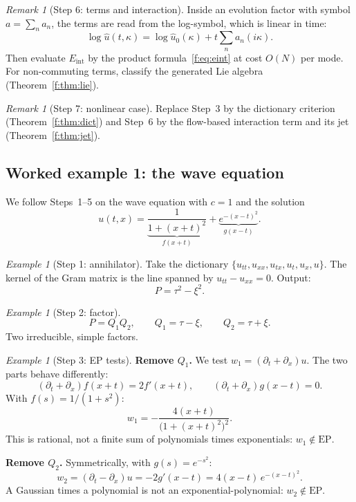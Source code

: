 \documentclass[11pt]{article}
\theoremstyle{plain}
\theoremstyle{definition}
\theoremstyle{remark}
\newtheorem{remark}[theorem]{Remark}
\newtheorem{example}[theorem]{Example}
\newcommand{\EP}{\mathrm{EP}}               %
\newcommand{\Eint}{E_{\mathrm{int}}}        %
\newenvironment{aside}[1]{\begin{remark}[#1]}{\end{remark}}
\begin{document}
\begin{aside}{Step 6: terms and interaction}
Inside an evolution factor with symbol $a=\sum_na_n$, the terms are read from the log-symbol, which is linear in time:
\[
\log\hat u(t,\kappa)=\log\hat u_0(\kappa)+t\sum_na_n(i\kappa).
\]
Then evaluate $\Eint$ by the product formula~\eqref{f:eq:eint} at cost $O(N)$ per mode. For non-commuting terms, classify the generated Lie algebra (Theorem~\ref{f:thm:lie}).
\end{aside}

\begin{aside}{Step 7: nonlinear case}
Replace Step~3 by the dictionary criterion (Theorem~\ref{f:thm:dict}) and Step~6 by the flow-based interaction term and its jet (Theorem~\ref{f:thm:jet}).
\end{aside}

\subsection{Worked example 1: the wave equation}

We follow Steps~1--5 on the wave equation with $c=1$ and the solution
\[
u(t,x)=\underbrace{\frac{1}{1+(x+t)^2}}_{f(x+t)}+\underbrace{e^{-(x-t)^2}}_{g(x-t)} .
\]

\begin{example}[{Step 1: annihilator}]
Take the dictionary $\{u_{tt},u_{xx},u_{tx},u_t,u_x,u\}$. The kernel of the Gram matrix is the line spanned by $u_{tt}-u_{xx}=0$. Output:
\[
P=\tau^2-\xi^2 .
\]
\end{example}

\begin{example}[{Step 2: factor}]
\[
P=Q_1Q_2,\qquad Q_1=\tau-\xi,\qquad Q_2=\tau+\xi .
\]
Two irreducible, simple factors.
\end{example}

\begin{example}[{Step 3: EP tests}]
\textbf{Remove $Q_1$.} We test $w_1=(\partial_t+\partial_x)u$. The two parts behave differently:
\[
(\partial_t+\partial_x)f(x+t)=2f'(x+t),\qquad (\partial_t+\partial_x)g(x-t)=0 .
\]
With $f(s)=1/(1+s^2)$:
\[
w_1=-\frac{4(x+t)}{\big(1+(x+t)^2\big)^2}.
\]
This is rational, not a finite sum of polynomials times exponentials: $w_1\notin\EP$.

\textbf{Remove $Q_2$.} Symmetrically, with $g(s)=e^{-s^2}$:
\[
w_2=(\partial_t-\partial_x)u=-2g'(x-t)=4(x-t)\,e^{-(x-t)^2}.
\]
A Gaussian times a polynomial is not an exponential-polynomial: $w_2\notin\EP$.
\end{example}
\end{document}
